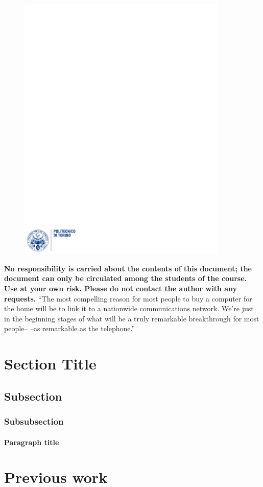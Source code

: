 \documentclass[12pt]{article}
\begin{document}
\begin{figure}
  \centering
  \includegraphics[width=10cm]{images/polito.pdf}
\end{figure}

\maketitle
\bigskip
\bigskip
\noindent \textbf{No responsibility is carried about the contents of this document; the document can only be circulated among the students of the course. Use at your own risk. Please do not contact the author with any requests.}
\newpage
\tableofcontents
\bigskip
\bigskip
``The most compelling reason for most people to buy a computer for the home will be to link it to a nationwide communications network. We’re just in the beginning stages of what will be a truly remarkable breakthrough for most people– –as remarkable as the telephone.''\\
\newpage

\section{Section Title}\label{section1}
\subsection{Subsection}
\subsubsection{Subsubsection}
\paragraph{Paragraph title}

\section{Previous work}



\end{document}

